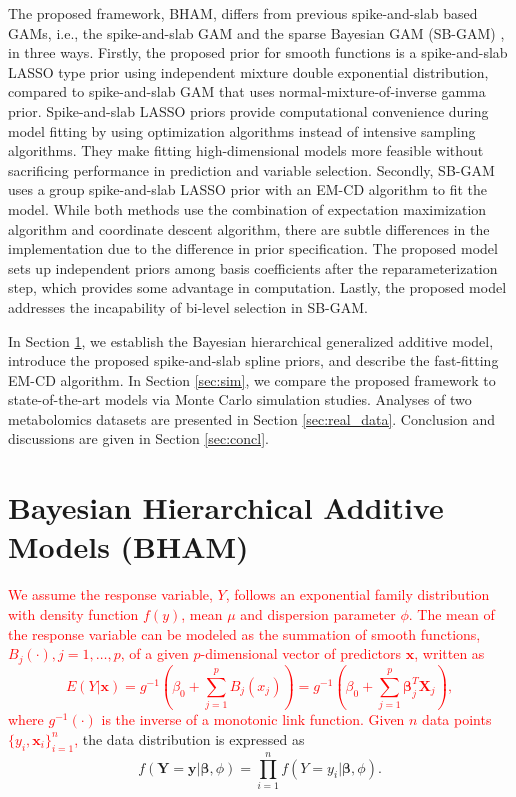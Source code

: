 \documentclass[AMA,STIX1COL,]{WileyNJD-v2}
\begin{document}
The proposed framework, BHAM, differs from previous spike-and-slab based
GAMs, i.e., the spike-and-slab GAM \citep{Scheipl2012} and the sparse
Bayesian GAM (SB-GAM) \citep{Bai2021}, in three ways. Firstly, the
proposed prior for smooth functions is a spike-and-slab LASSO type prior
using independent mixture double exponential distribution, compared to
spike-and-slab GAM that uses normal-mixture-of-inverse gamma prior.
Spike-and-slab LASSO priors provide computational convenience during
model fitting by using optimization algorithms instead of intensive
sampling algorithms. They make fitting high-dimensional models more
feasible without sacrificing performance in prediction and variable
selection. Secondly, SB-GAM uses a group spike-and-slab LASSO prior with
an EM-CD algorithm to fit the model. While both methods use the
combination of expectation maximization algorithm and coordinate descent
algorithm, there are subtle differences in the implementation due to the
difference in prior specification. The proposed model sets up
independent priors among basis coefficients after the reparameterization
step, which provides some advantage in computation. Lastly, the proposed
model addresses the incapability of bi-level selection in SB-GAM.

In Section \ref{sec:BHAM}, we establish the Bayesian hierarchical
generalized additive model, introduce the proposed spike-and-slab spline
priors, and describe the fast-fitting EM-CD algorithm. In Section
\ref{sec:sim}, we compare the proposed framework to state-of-the-art
models via Monte Carlo simulation studies. Analyses of two metabolomics
datasets are presented in Section \ref{sec:real_data}. Conclusion and
discussions are given in Section \ref{sec:concl}.

\section{Bayesian Hierarchical Additive Models (BHAM)}
\label{sec:BHAM}

\textcolor{red}{We assume the response variable, $Y$, follows an exponential family distribution with density function $f(y)$, mean $\mu$ and dispersion parameter $\phi$. The mean of the response variable can be modeled as the summation of smooth functions, $B_j(\cdot), j = 1, \dots, p$, of a given $p$-dimensional vector of predictors $\boldsymbol{x}$, written as 
\begin{equation}\label{eq:gam}
 E(Y|\boldsymbol{x}) = g^{-1}(\beta_0 + \sum\limits^p_{j=1}B_j(x_j)) = g^{-1}(\beta_0 + \sum\limits^p_{j=1} \boldsymbol{\beta}_j^T \boldsymbol{X}_j),
\end{equation}
where $g^{-1}(\cdot)$ is the inverse of a monotonic link function. Given $n$ data points $\{y_i, \boldsymbol{x}_i\}^n_{i=1}$,}
the data distribution is expressed as \begin{equation}
f(\boldsymbol{Y} = \boldsymbol{y}| \boldsymbol{\beta}, \phi) = \prod\limits^n_{i=1}f( Y = y_i|\boldsymbol{\beta}, \phi).\nonumber
\end{equation}
\end{document}
